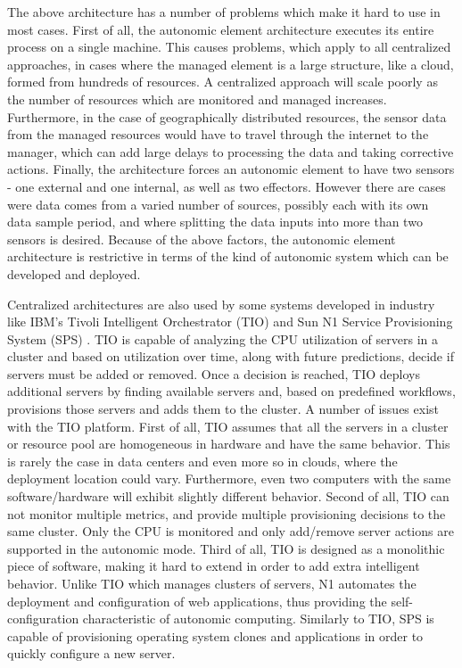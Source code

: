 The above architecture has a number of problems which make it hard to use in most cases. First of all, the autonomic element architecture executes its entire process on a single machine. This causes problems, which apply to all centralized approaches, in cases where the managed element is a large structure, like a cloud, formed from hundreds of resources. A centralized approach will scale poorly as the number of resources which are monitored and managed increases. Furthermore, in the case of geographically distributed resources, the sensor data from the managed resources would have to travel through the internet to the manager, which can add large delays to processing the data and taking corrective actions. Finally, the architecture forces an autonomic element to have two sensors - one external and one internal, as well as two effectors. However there are cases were data comes from a varied number of sources, possibly each with its own data sample period, and where splitting the data inputs into more than two sensors is desired. Because of the above factors, the autonomic element architecture is restrictive in terms of the kind of autonomic system which can be developed and deployed.

Centralized architectures are also used by some systems developed in industry like IBM's Tivoli Intelligent Orchestrator (TIO) \cite{product:tio} and Sun N1 Service Provisioning System (SPS) \cite{product:n1}. TIO is capable of analyzing the CPU utilization of servers in a cluster and based on utilization over time, along with future predictions, decide if servers must be added or removed. Once a decision is reached, TIO deploys additional servers by finding available servers and, based on predefined workflows, provisions those servers and adds them to the cluster. A number of issues exist with the TIO platform. First of all, TIO assumes that all the servers in a cluster or resource pool are homogeneous in hardware and have the same behavior. This is rarely the case in data centers and even more so in clouds, where the deployment location could vary. Furthermore, even two computers with the same software/hardware will exhibit slightly different behavior. Second of all, TIO can not monitor multiple metrics, and provide multiple provisioning decisions to the same cluster. Only the CPU is monitored and only add/remove server actions are supported in the autonomic mode. Third of all, TIO is designed as a monolithic piece of software, making it hard to extend in order to add extra intelligent behavior. Unlike TIO which manages clusters of servers, N1 automates the deployment and configuration of web applications, thus providing the self-configuration characteristic of autonomic computing. Similarly to TIO, SPS is capable of provisioning operating system clones and applications in order to quickly configure a new server.

